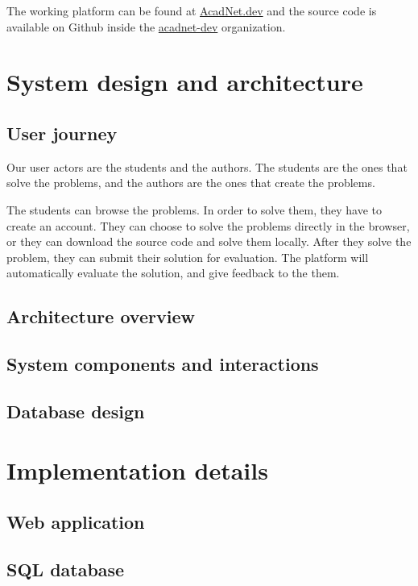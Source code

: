 \documentclass[12pt,a4paper]{report}
\begin{document}
The working platform can be found at \href{https://acadnet.dev}{AcadNet.dev} and the source code is available on Github inside the \href{https://github.com/acadnet-dev}{acadnet-dev} organization.


\chapter{System design and architecture}
\section{User journey}
Our user actors are the students and the authors. The students are the ones that solve the problems, and the authors are the ones that create the problems. 

The students can browse the problems. In order to solve them, they have to create an account. They can choose to solve the problems directly in the browser, or they can download the source code and solve them locally. After they solve the problem, they can submit their solution for evaluation. The platform will automatically evaluate the solution, and give feedback to the them. 

\section{Architecture overview}

\section{System components and interactions}

\section{Database design}



\chapter{Implementation details}
\section{Web application}

\section{SQL database}
\end{document}
